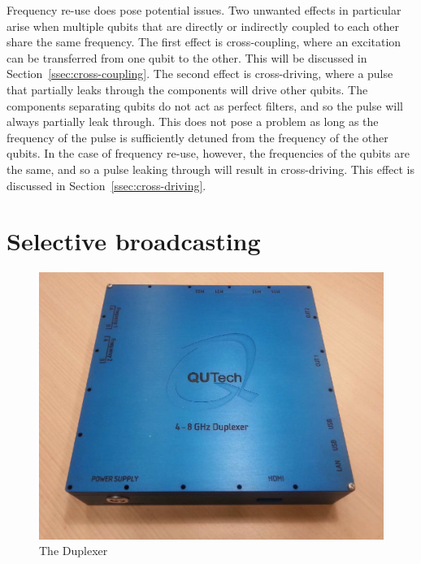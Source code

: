       Frequency re-use does pose potential issues. Two unwanted effects in particular arise when multiple qubits that are directly or indirectly coupled to each other share the same frequency. The first effect is cross-coupling, where an excitation can be transferred from one qubit to the other. This will be discussed in Section~\ref{ssec:cross-coupling}. The second effect is cross-driving, where a pulse that partially leaks through the components will drive other qubits. The components separating qubits do not act as perfect filters, and so the pulse will always partially leak through. This does not pose a problem as long as the frequency of the pulse is sufficiently detuned from the frequency of the other qubits. In the case of frequency re-use, however, the frequencies of the qubits are the same, and so a pulse leaking through will result in cross-driving. This effect is discussed in Section~\ref{ssec:cross-driving}.

    \section{Selective broadcasting}
      \label{sec:selective broadcasting using the Duplexer}
      \begin{figure}
        \begin{center}
        \vspace{-30pt}
          \includegraphics[width=\textwidth]{../Figures/Duplexer_with_background.png}
        \end{center}
        \vspace{-5pt}
        \caption{The Duplexer}
        \label{fig:Duplexer picture}
        \vspace{-10pt}
      \end{figure}

